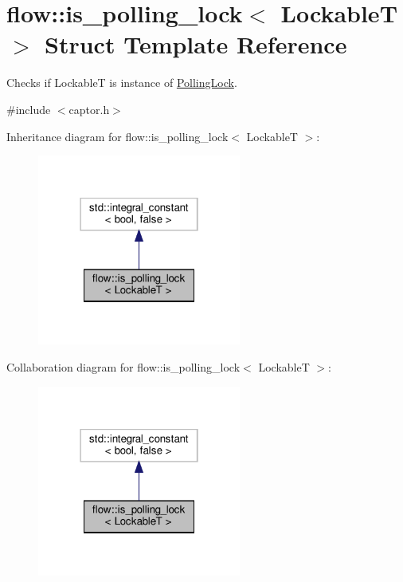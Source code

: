 \hypertarget{structflow_1_1is__polling__lock}{}\section{flow\+:\+:is\+\_\+polling\+\_\+lock$<$ LockableT $>$ Struct Template Reference}
\label{structflow_1_1is__polling__lock}


Checks if {\ttfamily LockableT} is instance of \hyperlink{structflow_1_1_polling_lock}{Polling\+Lock}.  




{\ttfamily \#include $<$captor.\+h$>$}



Inheritance diagram for flow\+:\+:is\+\_\+polling\+\_\+lock$<$ LockableT $>$\+:\nopagebreak
\begin{figure}[H]
\begin{center}
\leavevmode
\includegraphics[width=190pt]{structflow_1_1is__polling__lock__inherit__graph}
\end{center}
\end{figure}


Collaboration diagram for flow\+:\+:is\+\_\+polling\+\_\+lock$<$ LockableT $>$\+:\nopagebreak
\begin{figure}[H]
\begin{center}
\leavevmode
\includegraphics[width=190pt]{structflow_1_1is__polling__lock__coll__graph}
\end{center}
\end{figure}


